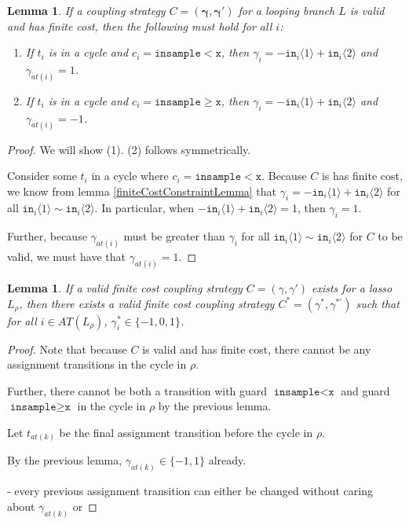 \documentclass[12pt]{article}
\newcommand{\gguard}[1][x]{\texttt{insample}\geq#1}
\newcommand{\lguard}[1][x]{\texttt{insample} < #1}
\newcommand{\brangle}[1]{\langle#1 \rangle}
\newtheorem{lemma}[thm]{Lemma}
\theoremstyle{definition}
\begin{document}
\begin{lemma}\label{cycleGammaConstraints}
    If a coupling strategy $C=(\mathbf{\gamma}, \mathbf{\gamma}')$ for a looping branch $L$ is valid and has finite cost, then the following must hold for all $i$:
    \begin{enumerate}
        \item If $t_i$ is in a cycle and $c_i = \lguard[\texttt{x}]$, then $\gamma_i = -\texttt{in}_i\brangle{1}+\texttt{in}_i\brangle{2}$ and $\gamma_{at(i)} = 1$.
        \item If $t_i$ is in a cycle and $c_i = \gguard[\texttt{x}]$, then $\gamma_i = -\texttt{in}_i\brangle{1}+\texttt{in}_i\brangle{2}$ and $\gamma_{at(i)} = -1$.
    \end{enumerate}
\end{lemma}
\begin{proof}
    We will show (1). (2) follows symmetrically.

    Consider some $t_i$ in a cycle where $c_i = \lguard[\texttt{x}]$. Because $C$ is has finite cost, we know from lemma \ref{finiteCostConstraintLemma} that $\gamma_i = -\texttt{in}_i\brangle{1}+\texttt{in}_i\brangle{2}$ for all  $\texttt{in}_i\brangle{1}\sim\texttt{in}_i\brangle{2}$. In particular, when $-\texttt{in}_i\brangle{1}+\texttt{in}_i\brangle{2}=1$, then $\gamma_i=1$. 
    
    Further, because $\gamma_{at(i)}$ must be greater than $\gamma_i$ for all $\texttt{in}_i\brangle{1}\sim\texttt{in}_i\brangle{2}$ for $C$ to be valid, we must have that $\gamma_{at(i)}=1$.
\end{proof}
\begin{lemma}
    If a valid finite cost coupling strategy $C = (\gamma, \gamma')$ exists for a lasso $L_\rho$, then there exists a valid finite cost coupling strategy $C^*= (\gamma^*, \gamma^{*\prime})$ such that for all $i\in AT(L_\rho)$, $\gamma_i^*\in \{-1, 0, 1\}$. 
\end{lemma}
\begin{proof}
    Note that because $C$ is valid and has finite cost, there cannot be any assignment transitions in the cycle in $\rho$. 

    Further, there cannot be both a transition with guard $\lguard[\texttt{x}]$ and guard $\gguard[\texttt{x}]$ in the cycle in $\rho$ by the previous lemma. 

    Let $t_{at(k)}$ be the final assignment transition before the cycle in $\rho$. 

    By the previous lemma, $\gamma_{at(k)} \in \{-1, 1\}$ already. 

    - every previous assignment transition can either be changed without caring about $\gamma_{at(k)}$ or 

\end{proof}
\end{document}
